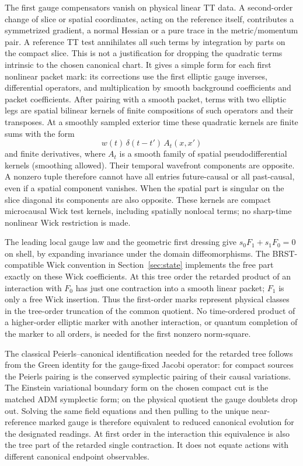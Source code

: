 The first gauge compensators vanish on physical linear TT data. A second-order change of slice or spatial coordinates, acting on the reference itself, contributes a symmetrized gradient, a normal Hessian or a pure trace in the metric/momentum pair. A reference TT test annihilates all such terms by integration by parts on the compact slice. This is not a justification for dropping the quadratic terms intrinsic to the chosen canonical chart. It gives a simple form for each first nonlinear packet mark: its corrections use the first elliptic gauge inverses, differential operators, and multiplication by smooth background coefficients and packet coefficients. After pairing with a smooth packet, terms with two elliptic legs are spatial bilinear kernels of finite compositions of such operators and their transposes. At a smoothly sampled exterior time these quadratic kernels are finite sums with the form
\[
   w(t)\,\delta(t-t')\,A_t(x,x')
\]
and finite derivatives, where \(A_t\) is a smooth family of spatial pseudodifferential kernels (smoothing allowed). Their temporal wavefront components are opposite. A nonzero tuple therefore cannot have all entries future-causal or all past-causal, even if a spatial component vanishes. When the spatial part is singular on the slice diagonal its components are also opposite. These kernels are compact microcausal Wick test kernels, including spatially nonlocal terms; no sharp-time nonlinear Wick restriction is made.

The leading local gauge law and the geometric first dressing give \(s_0F_1+s_1F_0=0\) on shell, by expanding invariance under the domain diffeomorphisms. The BRST-compatible Wick convention in Section~\ref{sec:state} implements the free part exactly on these Wick coefficients. At this tree order the retarded product of an interaction with \(F_0\) has just one contraction into a smooth linear packet; \(F_1\) is only a free Wick insertion. Thus the first-order marks represent physical classes in the tree-order truncation of the common quotient. No time-ordered product of a higher-order elliptic marker with another interaction, or quantum completion of the marker to all orders, is needed for the first nonzero norm-square.

The classical Peierls--canonical identification needed for the retarded tree follows from the Green identity for the gauge-fixed Jacobi operator: for compact sources the Peierls pairing is the conserved symplectic pairing of their causal variations. The Einstein variational boundary form on the chosen compact cut is the matched ADM symplectic form; on the physical quotient the gauge doublets drop out. Solving the same field equations and then pulling to the unique near-reference marked gauge is therefore equivalent to reduced canonical evolution for the designated readings. At first order in the interaction this equivalence is also the tree part of the retarded single contraction. It does not equate actions with different canonical endpoint observables.

